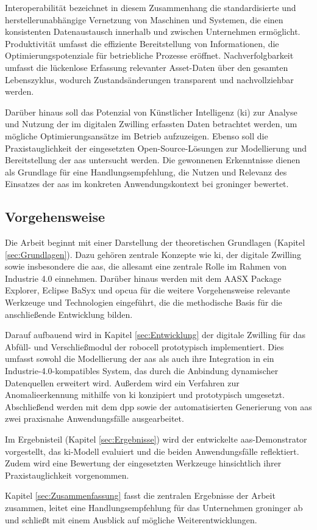 Interoperabilität bezeichnet in diesem Zusammenhang die standardisierte und herstellerunabhängige Vernetzung von Maschinen und Systemen, die einen konsistenten Datenaustausch innerhalb und zwischen Unternehmen ermöglicht. 
Produktivität umfasst die effiziente Bereitstellung von Informationen, die Optimierungspotenziale für betriebliche Prozesse eröffnet. 
Nachverfolgbarkeit umfasst die lückenlose Erfassung relevanter Asset-Daten über den gesamten Lebenszyklus, wodurch Zustandsänderungen transparent und nachvollziehbar werden.

Darüber hinaus soll das Potenzial von Künstlicher Intelligenz (\acs{ki}) zur Analyse und Nutzung der im digitalen Zwilling erfassten Daten betrachtet werden, um mögliche Optimierungsansätze im Betrieb aufzuzeigen. 
Ebenso soll die Praxistauglichkeit der eingesetzten Open-Source-Lösungen zur Modellierung und Bereitstellung der \acs{aas} untersucht werden.
Die gewonnenen Erkenntnisse dienen als Grundlage für eine Handlungsempfehlung, die Nutzen und Relevanz des Einsatzes der \acs{aas} im konkreten Anwendungskontext bei groninger bewertet.

\subsection{Vorgehensweise}

Die Arbeit beginnt mit einer Darstellung der theoretischen Grundlagen (Kapitel \ref{sec:Grundlagen}). 
Dazu gehören zentrale Konzepte wie \acs{ki}, der digitale Zwilling sowie insbesondere die \acs{aas}, die allesamt eine zentrale Rolle im Rahmen von Industrie 4.0 einnehmen. 
Darüber hinaus werden mit dem AASX Package Explorer, Eclipse BaSyx und \ac{opcua} für die weitere Vorgehensweise relevante Werkzeuge und Technologien eingeführt, die die methodische Basis für die anschließende Entwicklung bilden.

Darauf aufbauend wird in Kapitel \ref{sec:Entwicklung} der digitale Zwilling für das Abfüll- und Verschließmodul der robocell prototypisch implementiert. 
Dies umfasst sowohl die Modellierung der \acs{aas} als auch ihre Integration in ein Industrie-4.0-kompatibles System, das durch die Anbindung dynamischer Datenquellen erweitert wird. 
Außerdem wird ein Verfahren zur Anomalieerkennung mithilfe von \acs{ki} konzipiert und prototypisch umgesetzt. 
Abschließend werden mit dem \acs{dpp} sowie der automatisierten Generierung von \acs{aas} zwei praxisnahe Anwendungsfälle ausgearbeitet.

Im Ergebnisteil (Kapitel \ref{sec:Ergebnisse}) wird der entwickelte \acs{aas}-Demonstrator vorgestellt, das \acs{ki}-Modell evaluiert und die beiden Anwendungsfälle reflektiert. 
Zudem wird eine Bewertung der eingesetzten Werkzeuge hinsichtlich ihrer Praxistauglichkeit vorgenommen.

Kapitel \ref{sec:Zusammenfassung} fasst die zentralen Ergebnisse der Arbeit zusammen, leitet eine Handlungsempfehlung für das Unternehmen groninger ab und schließt mit einem Ausblick auf mögliche Weiterentwicklungen.
